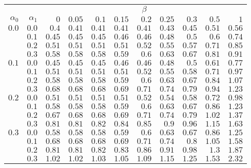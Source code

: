 \begin{tabular}{rr|rrrrrrrrr}
\hline\hline
 && \multicolumn{9}{c}{$\beta$}\\
 $\alpha_0$ & $\alpha_1$ & $0$ & $0.05$ & $0.1$ & $0.15$ & $0.2$ & $0.25$ & $0.3$ & $0.5$ & $1$ \\ 
 \hline
$0.0$ & $0.0$ & $0.4$ & $0.41$ & $0.41$ & $0.41$ & $0.41$ & $0.43$ & $0.45$ & $0.51$ & $0.56$\\ 
 & $0.1$ & $0.45$ & $0.45$ & $0.45$ & $0.46$ & $0.46$ & $0.48$ & $0.5$ & $0.6$ & $0.74$\\ 
 & $0.2$ & $0.51$ & $0.51$ & $0.51$ & $0.51$ & $0.52$ & $0.55$ & $0.57$ & $0.71$ & $0.85$\\ 
 & $0.3$ & $0.58$ & $0.58$ & $0.58$ & $0.59$ & $0.6$ & $0.63$ & $0.67$ & $0.81$ & $0.91$\\ 
\hline 
 $0.1$ & $0.0$ & $0.45$ & $0.45$ & $0.45$ & $0.46$ & $0.46$ & $0.48$ & $0.5$ & $0.61$ & $0.77$\\ 
 & $0.1$ & $0.51$ & $0.51$ & $0.51$ & $0.51$ & $0.52$ & $0.55$ & $0.58$ & $0.71$ & $0.97$\\ 
 & $0.2$ & $0.58$ & $0.58$ & $0.58$ & $0.59$ & $0.6$ & $0.63$ & $0.67$ & $0.84$ & $1.07$\\ 
 & $0.3$ & $0.68$ & $0.68$ & $0.68$ & $0.69$ & $0.71$ & $0.74$ & $0.79$ & $0.94$ & $1.23$\\ 
\hline 
 $0.2$ & $0.0$ & $0.51$ & $0.51$ & $0.51$ & $0.51$ & $0.52$ & $0.54$ & $0.58$ & $0.72$ & $0.98$\\ 
 & $0.1$ & $0.58$ & $0.58$ & $0.58$ & $0.59$ & $0.6$ & $0.63$ & $0.67$ & $0.86$ & $1.23$\\ 
 & $0.2$ & $0.67$ & $0.68$ & $0.68$ & $0.69$ & $0.71$ & $0.74$ & $0.79$ & $1.02$ & $1.37$\\ 
 & $0.3$ & $0.81$ & $0.81$ & $0.82$ & $0.84$ & $0.85$ & $0.9$ & $0.96$ & $1.15$ & $1.63$\\ 
\hline 
 $0.3$ & $0.0$ & $0.58$ & $0.58$ & $0.58$ & $0.59$ & $0.6$ & $0.63$ & $0.67$ & $0.86$ & $1.25$\\ 
 & $0.1$ & $0.68$ & $0.68$ & $0.68$ & $0.69$ & $0.71$ & $0.74$ & $0.8$ & $1.05$ & $1.58$\\ 
 & $0.2$ & $0.81$ & $0.81$ & $0.82$ & $0.83$ & $0.86$ & $0.91$ & $0.98$ & $1.3$ & $1.87$\\ 
 & $0.3$ & $1.02$ & $1.02$ & $1.03$ & $1.05$ & $1.09$ & $1.15$ & $1.25$ & $1.53$ & $2.32$\\ 
 \hline 
 \end{tabular}